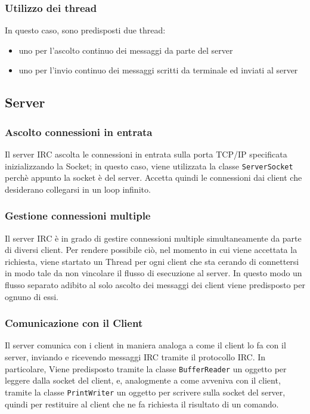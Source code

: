 \subsubsection{Utilizzo dei thread}
In questo caso, sono predisposti due thread:
\begin{itemize}
    \item uno per l'ascolto continuo dei messaggi da parte del server
    \item uno per l'invio continuo dei messaggi scritti da terminale ed inviati al server
\end{itemize}
\newpage

\subsection{Server}
\subsubsection{Ascolto connessioni in entrata}
Il server IRC ascolta le connessioni in entrata sulla porta TCP/IP specificata inizializzando la Socket; in questo caso, viene utilizzata la classe \texttt{ServerSocket} perchè appunto la socket è del server. Accetta quindi le connessioni dai client che desiderano collegarsi in un loop infinito.

\subsubsection{Gestione connessioni multiple}
Il server IRC è in grado di gestire connessioni multiple simultaneamente da parte di diversi client. Per rendere possibile ciò, nel momento in cui viene accettata la richiesta, viene startato un Thread per ogni client che sta cerando di connettersi in modo tale da non vincolare il flusso di esecuzione al server. In questo modo un flusso separato adibito al solo ascolto dei messaggi dei client viene predisposto per ognuno di essi.

\subsubsection{Comunicazione con il Client}
Il server comunica con i client in maniera analoga a come il client lo fa con il server, inviando e ricevendo messaggi IRC tramite il protocollo IRC. In particolare, Viene predisposto tramite la classe \texttt{BufferReader} un oggetto per leggere dalla socket del client, e, analogmente a come avveniva con il client, tramite la classe \texttt{PrintWriter} un oggetto per scrivere sulla socket del server, quindi per restituire al client che ne fa richiesta il risultato di un comando.

